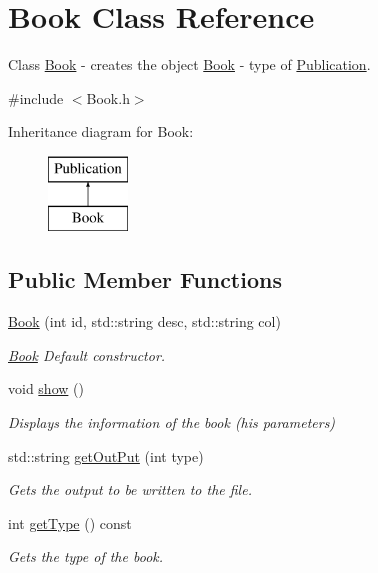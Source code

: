 \hypertarget{class_book}{}\section{Book Class Reference}
\label{class_book}


Class \hyperlink{class_book}{Book} -\/ creates the object \hyperlink{class_book}{Book} -\/ type of \hyperlink{class_publication}{Publication}.  




{\ttfamily \#include $<$Book.\+h$>$}

Inheritance diagram for Book\+:\begin{figure}[H]
\begin{center}
\leavevmode
\includegraphics[height=2.000000cm]{class_book}
\end{center}
\end{figure}
\subsection*{Public Member Functions}
\begin{DoxyCompactItemize}
\item 
\hyperlink{class_book_a45ca53a239ae4614d7cc687a07a5c96e}{Book} (int id, std\+::string desc, std\+::string col)
\begin{DoxyCompactList}\small\item\em \hyperlink{class_book}{Book} Default constructor. \end{DoxyCompactList}\item 
void \hyperlink{class_book_a8368f243d8a645444e8019760a50cc8b}{show} ()
\begin{DoxyCompactList}\small\item\em Displays the information of the book (his parameters) \end{DoxyCompactList}\item 
std\+::string \hyperlink{class_book_ab72570b8b4d902d6f3fe681dc29b2198}{get\+Out\+Put} (int type)
\begin{DoxyCompactList}\small\item\em Gets the output to be written to the file. \end{DoxyCompactList}\item 
int \hyperlink{class_book_a285dd3654bfced6baffd86320c39d42e}{get\+Type} () const
\begin{DoxyCompactList}\small\item\em Gets the type of the book. \end{DoxyCompactList}\end{DoxyCompactItemize}
